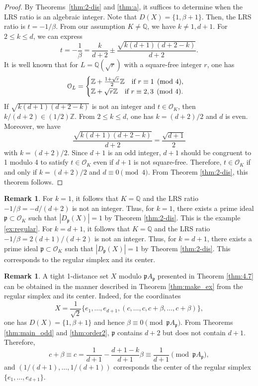 \documentclass[a4paper, 11pt]{article}
\newcommand{\Q}{\mathbb{Q}}
\newcommand{\p}{\mathfrak{p}}
\newcommand{\Oc}{\mathcal{O}}
\theoremstyle{definition}
\newtheorem{remark}[theorem]{Remark}
\begin{document}
\begin{proof}
By Theorems~\ref{thm:2-dis} and \ref{thm:a}, it suffices to determine when the LRS ratio is an algebraic integer.  Note that $D(X)=\{1,\beta+1\}$. Then, the LRS ratio is $t=-1/\beta$. 
From our assumption $K\ne \Q$, we have $k\ne 1,d+1$. 
For $2\leq k \leq d$, we can express
\[
t=-\frac{1}{\beta}=\frac{k}{d+2}\pm \frac{\sqrt{k(d+1)(d+2-k)}}{d+2}. 
\]
It is well known that for $L=\mathbb{Q}(\sqrt{r})$ with a square-free integer $r$, one has 
\[
\mathcal{O}_L=\begin{cases}
\mathbb{Z}+ \frac{1+\sqrt{r}}{2} \mathbb{Z} \text{\quad  if $r \equiv 1 \pmod{4}$},\\ 
\mathbb{Z}+ \sqrt{r} \mathbb{Z} \text{\quad if $ r \equiv 2,3 \pmod{4}$}.
\end{cases}
\]
If $\sqrt{k(d+1)(d+2-k)}$ is not an integer and $t \in \Oc_K$, 
then $k/(d+2) \in (1/2) \mathbb{Z}$. 
From $2\leq k \leq d$, one has $k=(d+2)/2$ and $d$ is even. Moreover, we have
\[
\frac{\sqrt{k(d+1)(d+2-k)}}{d+2}=\frac{\sqrt{d+1}}{2}
\]
with $k=(d+2)/2$. Since $d+1$ is an odd integer, $d+1$ should be congruent to 1 modulo 4 to satisfy $t\in \Oc_K$ even if $d+1$ is not square-free. 
Therefore, $t\in \Oc_K$ if and only if $k=(d+2)/2$ and $d\equiv 0 \pmod{4}$. 
From Theorem \ref{thm:2-dis}, this theorem follows. 
\end{proof}
\begin{remark}
For $k=1$, it follows that $K= \Q$ and the LRS ratio $-1/\beta=-d/(d+2)$ is not an integer. Thus, for $k=1$, there exists a prime ideal $\p \subset \Oc_K$ such that $|D_\p(X)|=1$ by Theorem \ref{thm:2-dis}. This is the example \eqref{ex:regular}.  
For $k=d+1$, it follows that $K= \Q$ and the LRS ratio $-1/\beta=2(d+1)/(d+2)$ is not an integer. Thus, for $k=d+1$, there exists a prime ideal $\p \subset \Oc_K$ such that $|D_\p(X)|=1$ by Theorem \ref{thm:2-dis}. 
This corresponds to the regular simplex and its center.  
\end{remark}

\begin{remark} \label{rem:modif}
A tight 1-distance set $X$ modulo $\p A_\p$ presented in Theorem \ref{thm:4.7} can be obtained in the manner described in Theorem \ref{thm:make_ex} from the regular simplex and its center. 
Indeed, for the coordinates 
\[
X=\frac{1}{\sqrt{2}}\{ e_1,\ldots, e_{d+1}, (c,\ldots,c,c+\beta,\ldots, c+\beta)\},
\]
one has $D(X)=\{1,\beta+1\}$ and hence $\beta\equiv 0 \pmod{\p A_\p}$. From Theorems \ref{thm:main_odd} and \ref{thm:order2},
$\p$ contains $d+2$ but does not contain $d+1$. Therefore,
\[
c+\beta \equiv c=\frac{1}{d+1}-\frac{d+1-k}{d+1} \beta \equiv \frac{1}{d+1} \pmod{\p A_\p}, 
\]
and $(1/(d+1),\ldots, 1/(d+1))$ corresponds the center of the regular simplex $\{e_1,\ldots, e_{d+1}\}$. 
\end{remark}
\end{document}
